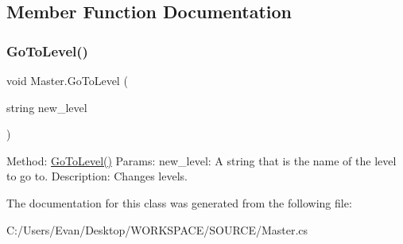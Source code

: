 \subsection{Member Function Documentation}
\mbox{\label{class_master_a4039986f86838df0020f147b0a049fb3}} 
\subsubsection{\texorpdfstring{GoToLevel()}{GoToLevel()}}
{\footnotesize\ttfamily void Master.\+Go\+To\+Level (\begin{DoxyParamCaption}\item[{string}]{new\+\_\+level }\end{DoxyParamCaption})}

Method\+: \mbox{\hyperlink{class_master_a4039986f86838df0020f147b0a049fb3}{Go\+To\+Level()}} Params\+: new\+\_\+level\+: A string that is the name of the level to go to. Description\+: Changes levels. 

The documentation for this class was generated from the following file\+:\begin{DoxyCompactItemize}
\item 
C\+:/\+Users/\+Evan/\+Desktop/\+W\+O\+R\+K\+S\+P\+A\+C\+E/\+S\+O\+U\+R\+C\+E/Master.\+cs\end{DoxyCompactItemize}
